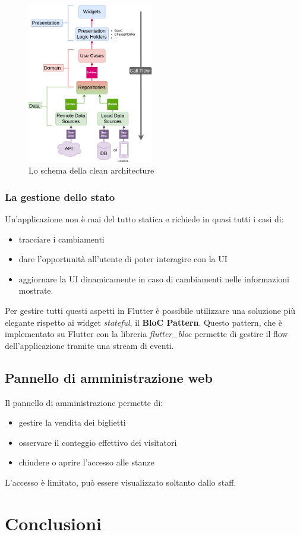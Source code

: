 \documentclass[12pt]{article}
\begin{document}
\begin{center}
\begin{figure}[htp]
    \centering
    \includegraphics[height=7cm]{diagrams/clean_architecture.png}
    \caption{Lo schema della clean architecture}
    \label{fig:clean_architecture}
\end{figure}
\end{center}

\subsubsection{La gestione dello stato}
Un’applicazione non è mai del tutto statica e richiede in quasi tutti i casi di:
\begin{itemize}
	\item tracciare i cambiamenti
	\item dare l’opportunità all’utente di poter interagire con la UI
	\item aggiornare la UI dinamicamente in caso di cambiamenti nelle informazioni mostrate.
\end{itemize}
Per gestire tutti questi aspetti in Flutter è possibile utilizzare una soluzione più elegante rispetto ai widget \emph{stateful}, il \textbf{BloC Pattern}. Questo pattern, che è implementato su Flutter con la libreria \emph{flutter\_bloc} permette di gestire il flow dell'applicazione tramite una stream di eventi. 


\subsection{Pannello di amministrazione web}
Il pannello di amministrazione permette di:
\begin{itemize}
    \item gestire la vendita dei biglietti
    \item osservare il conteggio effettivo dei visitatori
    \item chiudere o aprire l’accesso alle stanze
\end{itemize}
L'accesso è limitato, può essere visualizzato soltanto dallo staff.




\section{Conclusioni}



\printbibliography
\end{document}
